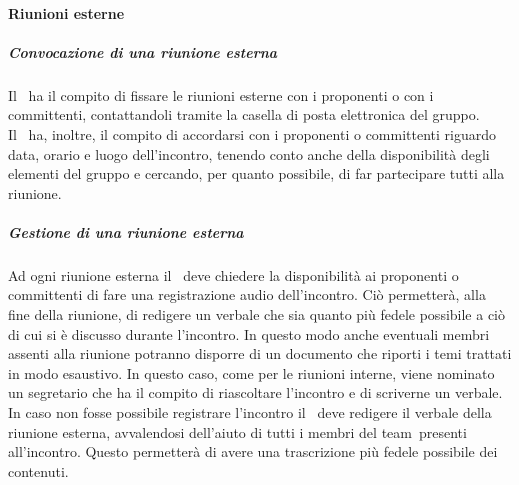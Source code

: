 \documentclass[../NormeProgetto.tex]{subfiles}
\begin{document}
		\paragraph{Riunioni esterne}
				\subparagraph{Convocazione di una riunione esterna}
					Il \responsabilediprogetto\ ha il compito di fissare le riunioni esterne con i proponenti o con i committenti, contattandoli tramite la casella di posta elettronica del gruppo.\\ Il \responsabilediprogetto\ ha, inoltre, il compito di accordarsi con i proponenti o committenti riguardo data, orario e luogo dell'incontro, tenendo conto anche della disponibilità degli elementi del gruppo e cercando, per quanto possibile, di far partecipare tutti alla riunione.
				\subparagraph{Gestione di una riunione esterna}
					Ad ogni riunione esterna il \responsabilediprogetto\ deve chiedere la disponibilità ai proponenti o committenti di fare una registrazione audio dell'incontro. Ciò permetterà, alla fine della riunione, di redigere un verbale che sia quanto più fedele possibile a ciò di cui si è discusso durante l'incontro. In questo modo anche eventuali membri assenti alla riunione potranno disporre di un documento che riporti i temi trattati in modo esaustivo. In questo caso, come per le riunioni interne, viene nominato un segretario che ha il compito di riascoltare l'incontro e di scriverne un verbale. In caso non fosse possibile registrare l'incontro il \responsabilediprogetto\ deve redigere il verbale della riunione esterna, avvalendosi dell'aiuto di tutti i membri del team\g\ presenti all'incontro. Questo permetterà di avere una trascrizione più fedele possibile dei contenuti.
\end{document}
